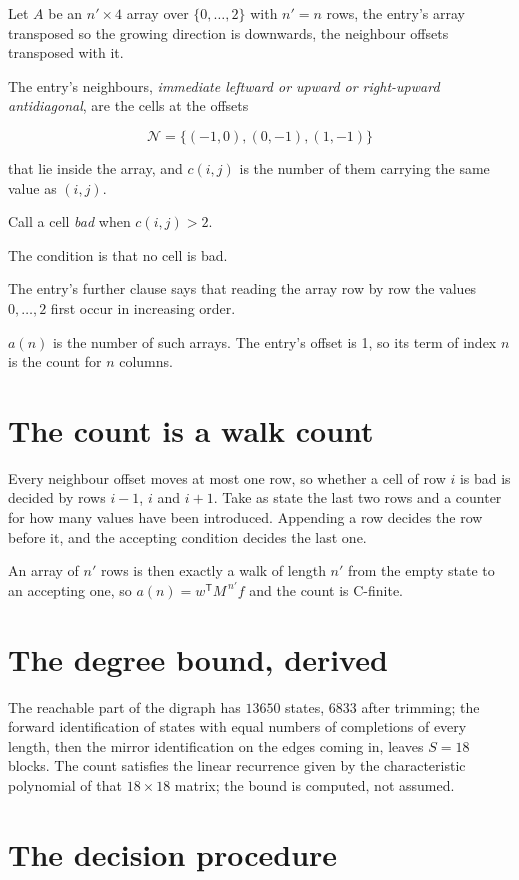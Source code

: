 \documentclass[11pt]{article}
\theoremstyle{definition}
\begin{document}
Let $A$ be an $n' \times 4$ array over $\{0,\dots,2\}$ with $n' = n$ rows, the entry's array transposed so the growing direction is downwards, the neighbour offsets transposed with it.

The entry's neighbours, {\itshape immediate leftward or upward or right-upward antidiagonal}, are the cells at the offsets

\[\mathcal{N} = \{(-1,0), (0,-1), (1,-1)\}\]

that lie inside the array, and $c(i,j)$ is the number of them carrying the same value as $(i,j)$.

Call a cell {\itshape bad} when $c(i,j) > 2$.

The condition is that no cell is bad.

The entry's further clause says that reading the array row by row the values $0,\dots,2$ first occur in increasing order.

$a(n)$ is the number of such arrays. The entry's offset is 1, so its term of index $n$ is the count for $n$ columns.

\section{The count is a walk count}

Every neighbour offset moves at most one row, so whether a cell of row $i$ is bad is decided by rows $i-1$, $i$ and $i+1$. Take as state the last two rows and a counter for how many values have been introduced. Appending a row decides the row before it, and the accepting condition decides the last one.

An array of $n'$ rows is then exactly a walk of length $n'$ from the empty state to an accepting one, so $a(n) = w^{\mathsf T}M^{\,n'}f$ and the count is C-finite.

\section{The degree bound, derived}

The reachable part of the digraph has $13650$ states, $6833$ after trimming; the forward identification of states with equal numbers of completions of every length, then the mirror identification on the edges coming in, leaves $S = 18$ blocks. The count satisfies the linear recurrence given by the characteristic polynomial of that $18\times18$ matrix; the bound is computed, not assumed.

\section{The decision procedure}
\end{document}
